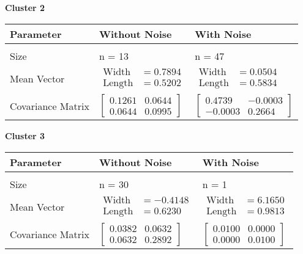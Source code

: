 \documentclass[12pt]{article}
\begin{document}
\vspace{2cm}

\noindent\textbf{Cluster 2} \\[0.5cm]
\begin{tabular}{l|l|l}
\textbf{Parameter} & \textbf{Without Noise} & \textbf{With Noise} \\[0.3cm]
\hline \\[0.3cm]
Size & n = 13 & n = 47 \\[0.5cm]
Mean Vector & $\begin{aligned}
\text{Width} &= 0.7894 \\[0.2cm]
\text{Length} &= 0.5202
\end{aligned}$ & 
$\begin{aligned}
\text{Width} &= 0.0504 \\[0.2cm]
\text{Length} &= 0.5834
\end{aligned}$ \\[0.8cm]
Covariance Matrix & $\begin{bmatrix}
0.1261 & 0.0644 \\[0.2cm]
0.0644 & 0.0995
\end{bmatrix}$ & 
$\begin{bmatrix}
0.4739 & -0.0003 \\[0.2cm]
-0.0003 & 0.2664
\end{bmatrix}$
\end{tabular}

\vspace{2cm}

\noindent\textbf{Cluster 3} \\[0.5cm]
\begin{tabular}{l|l|l}
\textbf{Parameter} & \textbf{Without Noise} & \textbf{With Noise} \\[0.3cm]
\hline \\[0.3cm]
Size & n = 30 & n = 1 \\[0.5cm]
Mean Vector & $\begin{aligned}
\text{Width} &= -0.4148 \\[0.2cm]
\text{Length} &= 0.6230
\end{aligned}$ & 
$\begin{aligned}
\text{Width} &= 6.1650 \\[0.2cm]
\text{Length} &= 0.9813
\end{aligned}$ \\[0.8cm]
Covariance Matrix & $\begin{bmatrix}
0.0382 & 0.0632 \\[0.2cm]
0.0632 & 0.2892
\end{bmatrix}$ & 
$\begin{bmatrix}
0.0100 & 0.0000 \\[0.2cm]
0.0000 & 0.0100
\end{bmatrix}$
\end{tabular}
\end{document}
